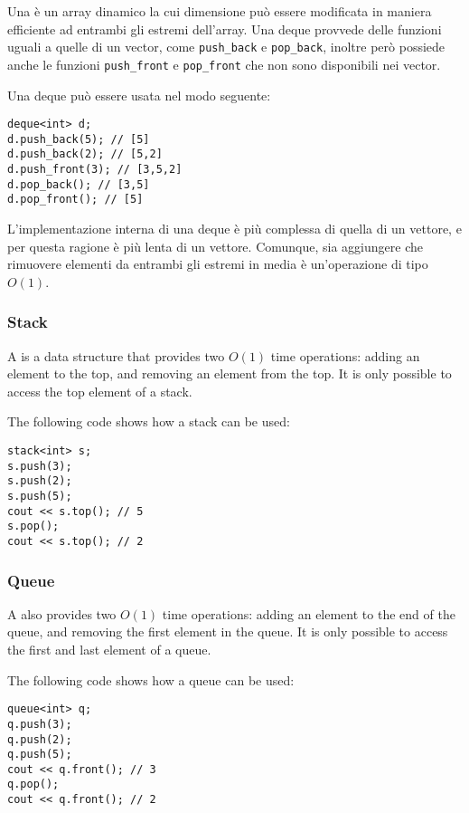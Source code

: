 
Una  è un array dinamico
la cui dimensione può essere modificata in 
maniera efficiente ad entrambi gli estremi dell'array.
Una deque provvede delle funzioni uguali a quelle di un vector,
come \texttt{push\_back} e \texttt{pop\_back}, 
inoltre però possiede anche le funzioni
\texttt{push\_front} e \texttt{pop\_front}
che non sono disponibili nei vector.

Una deque può essere usata nel modo seguente:
\begin{lstlisting}
deque<int> d;
d.push_back(5); // [5]
d.push_back(2); // [5,2]
d.push_front(3); // [3,5,2]
d.pop_back(); // [3,5]
d.pop_front(); // [5]
\end{lstlisting}

L'implementazione interna di una deque è più 
complessa di quella di un vettore,
e per questa ragione è più lenta di un vettore.
Comunque, sia aggiungere che rimuovere elementi 
da entrambi gli estremi in media è un'operazione di tipo $O(1)$.

\subsubsection{Stack}


A 
is a data structure that provides two
$O(1)$ time operations:
adding an element to the top,
and removing an element from the top.
It is only possible to access the top
element of a stack.

The following code shows how a stack can be used:
\begin{lstlisting}
stack<int> s;
s.push(3);
s.push(2);
s.push(5);
cout << s.top(); // 5
s.pop();
cout << s.top(); // 2
\end{lstlisting}
\subsubsection{Queue}


A  also
provides two $O(1)$ time operations:
adding an element to the end of the queue,
and removing the first element in the queue.
It is only possible to access the first
and last element of a queue.

The following code shows how a queue can be used:
\begin{lstlisting}
queue<int> q;
q.push(3);
q.push(2);
q.push(5);
cout << q.front(); // 3
q.pop();
cout << q.front(); // 2
\end{lstlisting}

